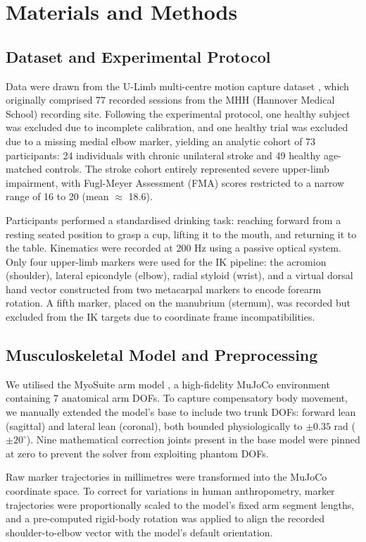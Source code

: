 \documentclass[12pt, a4paper]{article}
\begin{document}
\section{Materials and Methods}

\subsection{Dataset and Experimental Protocol}
Data were drawn from the U-Limb multi-centre motion capture dataset \cite{averta2021ulimb}, which originally comprised 77 recorded sessions from the MHH (Hannover Medical School) recording site. Following the experimental protocol, one healthy subject was excluded due to incomplete calibration, and one healthy trial was excluded due to a missing medial elbow marker, yielding an analytic cohort of 73 participants: 24 individuals with chronic unilateral stroke and 49 healthy age-matched controls. The stroke cohort entirely represented severe upper-limb impairment, with Fugl-Meyer Assessment (FMA) scores restricted to a narrow range of 16 to 20 (mean $\approx$ 18.6).

Participants performed a standardised drinking task: reaching forward from a resting seated position to grasp a cup, lifting it to the mouth, and returning it to the table. Kinematics were recorded at 200 Hz using a passive optical system. Only four upper-limb markers were used for the IK pipeline: the acromion (shoulder), lateral epicondyle (elbow), radial styloid (wrist), and a virtual dorsal hand vector constructed from two metacarpal markers to encode forearm rotation. A fifth marker, placed on the manubrium (sternum), was recorded but excluded from the IK targets due to coordinate frame incompatibilities. 

\subsection{Musculoskeletal Model and Preprocessing}
We utilised the MyoSuite arm model \cite{caggiano2022}, a high-fidelity MuJoCo environment containing 7 anatomical arm DOFs. To capture compensatory body movement, we manually extended the model's base to include two trunk DOFs: forward lean (sagittal) and lateral lean (coronal), both bounded physiologically to $\pm0.35$ rad ($\pm20^{\circ}$). Nine mathematical correction joints present in the base model were pinned at zero to prevent the solver from exploiting phantom DOFs.

Raw marker trajectories in millimetres were transformed into the MuJoCo coordinate space. To correct for variations in human anthropometry, marker trajectories were proportionally scaled to the model's fixed arm segment lengths, and a pre-computed rigid-body rotation \cite{wahba1965} was applied to align the recorded shoulder-to-elbow vector with the model's default orientation. 
\end{document}

